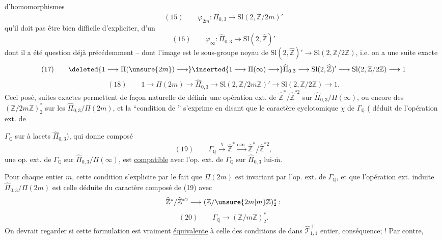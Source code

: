 d'homomorphismes
\[
(15)\qquad \varphi_{2m}:\widehat\Pi_{0,3}\longrightarrow\mathrm{Sl}(2,\mathbb Z/2m)'
\]
qu'il  doit pas être bien difficile d'expliciter,   d'un 
\[
(16)\qquad \varphi_{\infty}:\widehat\Pi_{0,3}\longrightarrow\mathrm{Sl}(2,\widehat{\mathbb Z})'
\]
dont il a été question déjà précédemment --  dont l'image est le sous-groupe noyau de $\mathrm{Sl}(2,\widehat{\mathbb Z})'\longrightarrow\mathrm{Sl}(2,\mathbb Z/2\mathbb Z)$, i.e. on a une suite exacte
\[
(17)\qquad \deleted{1\longrightarrow\Pi(\unsure{2m})\longrightarrow}\inserted{1\longrightarrow\Pi(\infty)\longrightarrow}\widehat\Pi_{0,3}\longrightarrow\mathrm{Sl}(2,\widehat{\mathbb Z})'\longrightarrow\mathrm{Sl}(2,\mathbb Z/2\mathbb Z)\longrightarrow1
\]
\[
(18)\qquad 1\longrightarrow\Pi(2m)\longrightarrow\widehat\Pi_{0,3}\longrightarrow\mathrm{Sl}(2,\mathbb Z/2m\mathbb Z)'\longrightarrow\mathrm{Sl}(2,\mathbb Z/2\mathbb Z)\longrightarrow1.
\]
Ceci posé,  suites exactes permettent de façon naturelle de définir une opération ext. de $\widehat{\mathbb Z}^{*}/\widehat{\mathbb Z}^{*2}$ sur $\widehat\Pi_{0,3}/\Pi(\infty)$, ou encore des $(\mathbb Z/2m\mathbb Z)^*_2$ sur les $\widehat\Pi_{0,3}/\Pi(2m)$, et la ``condition de '' s'exprime en disant que le caractère cyclotomique $\chi$ de $\Gamma_{\mathbb Q}$ ( déduit de l'opération ext. de

$\Gamma_{\mathbb Q}$ sur   à lacets $\widehat\Pi_{0,3}$), qui donne  composé
\[
(19)\qquad \Gamma_{\mathbb Q}\xrightarrow{\chi}\widehat{\mathbb Z}^{*}\xrightarrow{\mathrm{can.}}\widehat{\mathbb Z}^{*}/\widehat{\mathbb Z}^{*2},
\]
 une op. ext. de $\Gamma_{\mathbb Q}$ sur $\widehat\Pi_{0,3}/\Pi(\infty)$, est \uline{compatible} avec l'op. ext. de $\Gamma_{\mathbb Q}$ sur $\widehat\Pi_{0,3}$ lui-$\overline{\mathrm m}$.

Pour chaque entier $m$, cette condition s'explicite par le fait que $\Pi(2m)$ est invariant par l'op. ext. de $\Gamma_{\mathbb Q}$, et que l'opération ext. induite  $\widehat\Pi_{0,3}/\Pi(2m)$ est celle déduite du caractère composé de (19) avec
\[
\widehat{\mathbb Z}^{*}/\widehat{\mathbb Z}^{*2}\longrightarrow(\mathbb Z/\unsure{2m|m}\mathbb Z)^*_2:
\]
\[
(20)\qquad \Gamma_{\mathbb Q}\longrightarrow(\mathbb Z/m\mathbb Z)^*_2.
\]
On devrait regarder si cette formulation est vraiment \uline{équivalente} à celle des conditions de  dans $\widehat{\mathcal T}_{1,1}^{+\prime}$  entier,   conséquence;  ! Par contre, 
